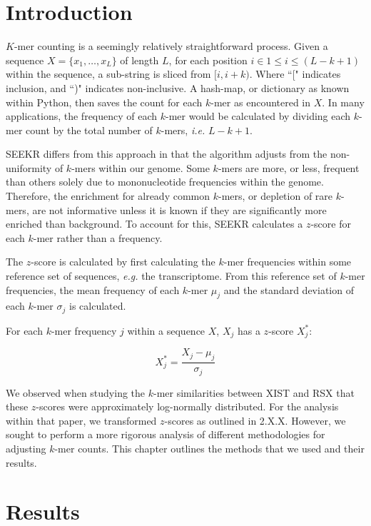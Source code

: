 \section{Introduction}
$K$-mer counting is a seemingly relatively straightforward process. Given a sequence $X = \{x_1,\dots,x_L\}$ of length $L$, for each position $i\in 1\leq i\leq \left(L-k+1\right)$ within the sequence, a sub-string is sliced from $[i,i+k)$. Where ``[" indicates inclusion, and ``)" indicates non-inclusive. A hash-map, or dictionary as known within Python, then saves the count for each $k$-mer as encountered in $X$. In many applications, the frequency of each $k$-mer would be calculated by dividing each $k$-mer count by the total number of $k$-mers, \emph{i.e.} $L-k+1$. 

SEEKR differs from this approach in that the algorithm adjusts from the non-uniformity of $k$-mers within our genome. Some $k$-mers are more, or less, frequent than others solely due to mononucleotide frequencies within the genome. Therefore, the enrichment for already common $k$-mers, or depletion of rare $k$-mers, are not informative unless it is known if they are significantly more enriched than background. To account for this, SEEKR calculates a $z$-score for each $k$-mer rather than a frequency.

The $z$-score is calculated by first calculating the $k$-mer frequencies within some reference set of sequences, \emph{e.g.} the transcriptome. From this reference set of $k$-mer frequencies, the mean frequency of each $k$-mer $\mu_j$ and the standard deviation of each $k$-mer $\sigma_j$ is calculated. 

For each $k$-mer frequency $j$ within a sequence $X$, $X_j$ has a $z$-score $X^*_j$: 

\begin{equation}
    X_j^* = \frac{X_j-\mu_j}{\sigma_j}
    \label{eq:zscore}
\end{equation}


We observed when studying the $k$-mer similarities between XIST and RSX that these $z$-scores were approximately log-normally distributed. For the analysis within that paper, we transformed $z$-scores as outlined in 2.X.X. However, we sought to perform a more rigorous analysis of different methodologies for adjusting $k$-mer counts. This chapter outlines the methods that we used and their results. 

\section{Results} 

